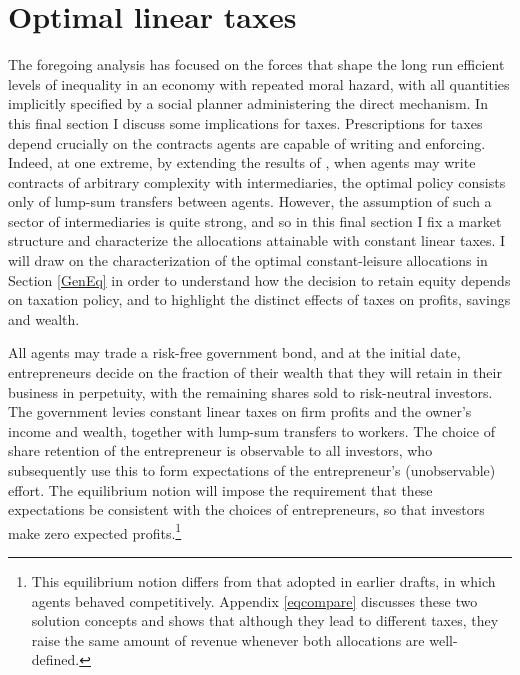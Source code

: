 \documentclass[11pt]{article}
\theoremstyle{plain}
\begin{document}

\section{Optimal linear taxes} \label{Imp}

The foregoing analysis has focused on the forces that shape the long run efficient levels of inequality in an economy with repeated moral hazard, with all quantities implicitly specified by a social planner administering the direct mechanism. In this final section I discuss some implications for taxes. Prescriptions for taxes depend crucially on the contracts agents are capable of writing and enforcing. Indeed, at one extreme, by extending the results of \cite{atkeson_efficient_1992}, when agents may write contracts of arbitrary complexity with intermediaries, the optimal policy consists only of lump-sum transfers between agents. However, the assumption of such a sector of intermediaries is quite strong, and so in this final section I fix a market structure and characterize the allocations attainable with constant linear taxes. I will draw on the characterization of the optimal constant-leisure allocations in Section \ref{GenEq} in order to understand how the decision to retain equity depends on taxation policy, and to highlight the distinct effects of taxes on profits, savings and wealth. 


All agents may trade a risk-free government bond, and at the initial date, entrepreneurs decide on the fraction of their wealth that they will retain in their business in perpetuity, with the remaining shares sold to risk-neutral investors. The government levies constant linear taxes on firm profits and the owner's income and wealth, together with lump-sum transfers to workers. The choice of share retention of the entrepreneur is observable to all investors, who subsequently use this to form expectations of the entrepreneur's (unobservable) effort. The equilibrium notion will impose the requirement that these expectations be consistent with the choices of entrepreneurs, so that investors make zero expected profits.\footnote{This equilibrium notion differs from that adopted in earlier drafts, in which agents behaved competitively. Appendix \ref{eqcompare} discusses these two solution concepts and shows that although they lead to different taxes, they raise the same amount of revenue whenever both allocations are well-defined.}
\end{document}
